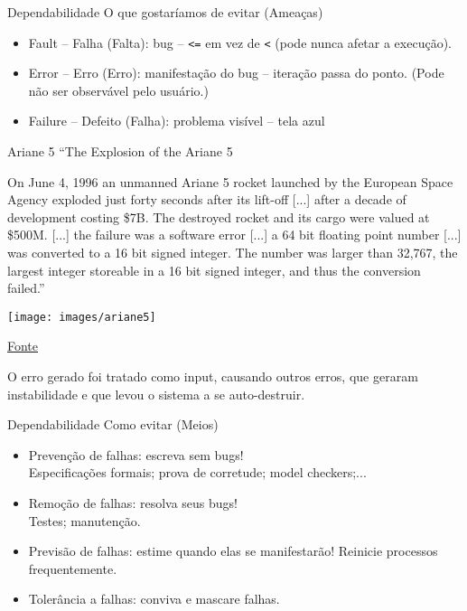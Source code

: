 \begin{frame}[fragile]{Dependabilidade}
O que gostaríamos de evitar (Ameaças)
\begin{itemize}
	\item Fault -- Falha (Falta): bug -- \lstinline|<=| em vez de \lstinline|<| (pode nunca afetar a execução).
	\item Error -- Erro  (Erro): manifestação do bug -- iteração passa do ponto. (Pode não ser observável pelo usuário.)
	\item Failure -- Defeito (Falha): problema visível -- tela azul
\end{itemize}
\end{frame}


\begin{frame}{Ariane 5}
``The Explosion of the Ariane 5

On June 4, 1996 an unmanned Ariane 5 rocket launched by the European Space Agency exploded just forty seconds after its lift-off [...] after a decade of development costing \$7B. The destroyed rocket and its cargo were valued at \$500M. [...] the failure was a software error [...] a 64 bit floating point number [...] was converted to a 16 bit signed integer. The number was larger than 32,767, the largest integer storeable in a 16 bit signed integer, and thus the conversion failed.''

\texttt{[image: images/ariane5]}

\href{http://www-users.math.umn.edu/~arnold/disasters/ariane.html}{Fonte}
\end{frame}

O erro gerado foi tratado como input, causando outros erros, que geraram instabilidade e que levou o sistema a se auto-destruir.

\begin{frame}{Dependabilidade}
Como evitar (Meios)
\begin{itemize}
	\item Prevenção de falhas: \pause escreva sem bugs!\\
	Especificações formais; prova de corretude; model checkers;...

	\item Remoção de falhas: \pause resolva seus bugs!\\
	Testes; manutenção.	

	\item Previsão de falhas: \pause estime quando elas se manifestarão!
	Reinicie processos frequentemente.

	\item Tolerância a falhas: \pause conviva e mascare falhas.
\end{itemize}
\end{frame}

